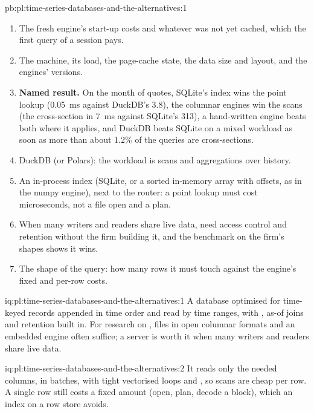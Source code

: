 \begin{solution}{pb:pl:time-series-databases-and-the-alternatives:1}
\begin{enumerate}
\item The fresh engine's start-up costs and whatever was not yet cached, which the first query of a session pays.
\item The machine, its load, the page-cache state, the data size and layout, and the engines' versions.
\item \textbf{Named result.} On the month of quotes, SQLite's index wins the point lookup (0.05~ms against DuckDB's 3.8), the
columnar engines win the scans (the cross-section in 7~ms against SQLite's 313), a hand-written engine beats both where it applies,
and DuckDB beats SQLite on a mixed workload as soon as more than about 1.2\% of the queries are cross-sections.
\item DuckDB (or Polars): the workload is scans and aggregations over history.
\item An in-process index (SQLite, or a sorted in-memory array with offsets, as in the numpy engine), next to the router: a point
lookup must cost microseconds, not a file open and a plan.
\item When many writers and readers share live data, need access control and retention without the firm building it, and the
benchmark on the firm's shapes shows it wins.
\item The shape of the query: how many rows it must touch against the engine's fixed and per-row costs.
\end{enumerate}
\end{solution}

\begin{solution}{iq:pl:time-series-databases-and-the-alternatives:1}
A database optimised for time-keyed records appended in time order and read by time ranges, with , as-of joins and
retention built in. For research on , files in open columnar formats and an embedded engine often suffice; a server is
worth it when many writers and readers share live data.
\end{solution}

\begin{solution}{iq:pl:time-series-databases-and-the-alternatives:2}
It reads only the needed columns, in batches, with tight vectorised loops and , so scans are cheap per row.
A single row still costs a fixed amount (open, plan, decode a block), which an index on a row store avoids.
\end{solution}

